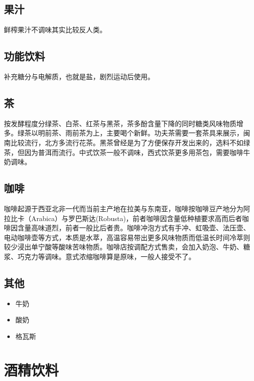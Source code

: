 \documentclass[
  letterpaper,
  DIV=11,
  numbers=noendperiod]{scrreprt}
\providecommand{\tightlist}{%
  \setlength{\itemsep}{0pt}\setlength{\parskip}{0pt}}\usepackage{longtable,booktabs,array}
\begin{document}
\subsection{果汁}\label{ux679cux6c41}

鲜榨果汁不调味其实比较反人类。

\subsection{功能饮料}\label{ux529fux80fdux996eux6599}

补充糖分与电解质，也就是盐，剧烈运动后使用。

\subsection{茶}\label{ux8336}

按发酵程度分绿茶、白茶、红茶与黑茶，茶多酚含量下降的同时糖类风味物质增多。绿茶以明前茶、雨前茶为上，主要喝个新鲜。功夫茶需要一套茶具来展示，闽南比较流行，北方多流行花茶。黑茶曾经是为了方便保存开发出来的，选料不如绿茶，但因为普洱而流行。中式饮茶一般不调味，西式饮茶更多用茶包，需要咖啡牛奶调味。

\subsection{咖啡}\label{ux5496ux5561}

咖啡起源于西亚北非一代而当前主产地在拉美与东南亚，咖啡按咖啡豆产地分为阿拉比卡（Arabica）与罗巴斯达(Robusta)，前者咖啡因含量低种植要求高而后者咖啡因含量高味道烈，前者一般比后者贵。咖啡冲泡方式有手冲、虹吸壶、法压壶、电动咖啡壶等方式，本质是水萃，高温容易带出更多风味物质而低温长时间冷萃则较少浸出单宁酸等酸味苦味物质。咖啡店按调配方式售卖，会加入奶泡、牛奶、糖浆、巧克力等调味。意式浓缩咖啡算是原味，一般人接受不了。

\subsection{其他}\label{ux5176ux4ed6}

\begin{itemize}
\tightlist
\item
  牛奶
\item
  酸奶
\item
  格瓦斯
\end{itemize}

\section{酒精饮料}\label{ux9152ux7cbeux996eux6599}
\end{document}
